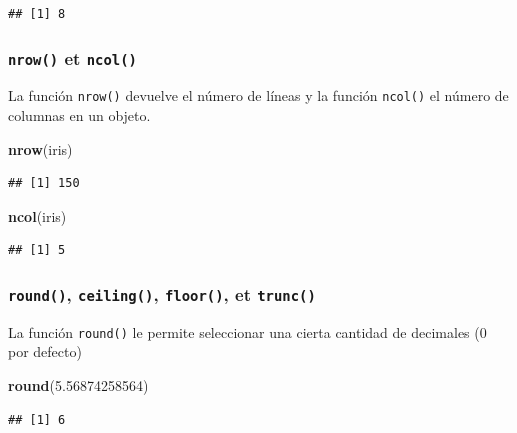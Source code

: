 \documentclass[
]{book}
\newenvironment{Shaded}{\begin{snugshade}}{\end{snugshade}}
\newcommand{\FloatTok}[1]{\textcolor[rgb]{0.00,0.00,0.81}{#1}}
\newcommand{\KeywordTok}[1]{\textcolor[rgb]{0.13,0.29,0.53}{\textbf{#1}}}
\newcommand{\NormalTok}[1]{#1}
\begin{document}
\begin{verbatim}
## [1] 8
\end{verbatim}

\hypertarget{l015nrow}{%
\subsubsection{\texorpdfstring{\texttt{nrow()} et \texttt{ncol()}}{nrow() et ncol()}}\label{l015nrow}}

La función \texttt{nrow()} devuelve el número de líneas y la función \texttt{ncol()} el número de columnas en un objeto.

\begin{Shaded}
\begin{Highlighting}[]
\KeywordTok{nrow}\NormalTok{(iris)}
\end{Highlighting}
\end{Shaded}

\begin{verbatim}
## [1] 150
\end{verbatim}

\begin{Shaded}
\begin{Highlighting}[]
\KeywordTok{ncol}\NormalTok{(iris)}
\end{Highlighting}
\end{Shaded}

\begin{verbatim}
## [1] 5
\end{verbatim}

\hypertarget{l015round}{%
\subsubsection{\texorpdfstring{\texttt{round()}, \texttt{ceiling()}, \texttt{floor()}, et \texttt{trunc()}}{round(), ceiling(), floor(), et trunc()}}\label{l015round}}

La función \texttt{round()} le permite seleccionar una cierta cantidad de decimales (0 por defecto)

\begin{Shaded}
\begin{Highlighting}[]
\KeywordTok{round}\NormalTok{(}\FloatTok{5.56874258564}\NormalTok{)}
\end{Highlighting}
\end{Shaded}

\begin{verbatim}
## [1] 6
\end{verbatim}
\end{document}

